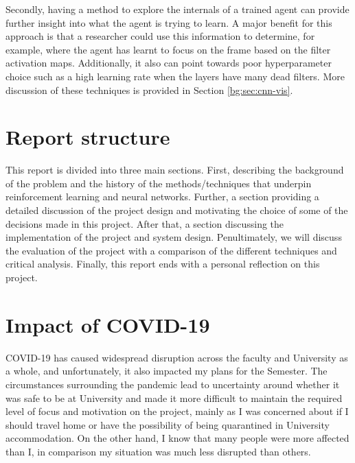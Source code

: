 Secondly, having a method to explore the internals of a trained agent can provide further insight into what the agent is trying to learn. A major benefit for this approach is that a researcher could use this information to determine, for example, where the agent has learnt to focus on the frame based on the filter activation maps. Additionally, it also can point towards poor hyperparameter choice such as a high learning rate when the layers have many dead filters. More discussion of these techniques is provided in Section \ref{bg:sec:cnn-vis}.

\section{Report structure}
\label{intro:sec:report_struc}

This report is divided into three main sections. First, describing the background of the problem and the history of the methods/techniques that underpin reinforcement learning and neural networks. Further, a section providing a detailed discussion of the project design and motivating the choice of some of the decisions made in this project. After that, a section discussing the implementation of the project and system design. Penultimately, we will discuss the evaluation of the project with a comparison of the different techniques and critical analysis. Finally, this report ends with a personal reflection on this project.

\section{Impact of COVID-19}
COVID-19 has caused widespread disruption across the faculty and University as a whole, and unfortunately, it also impacted my plans for the Semester. The circumstances surrounding the pandemic lead to uncertainty around whether it was safe to be at University and made it more difficult to maintain the required level of focus and motivation on the project, mainly as I was concerned about if I should travel home or have the possibility of being quarantined in University accommodation. On the other hand, I know that many people were more affected than I, in comparison my situation was much less disrupted than others.